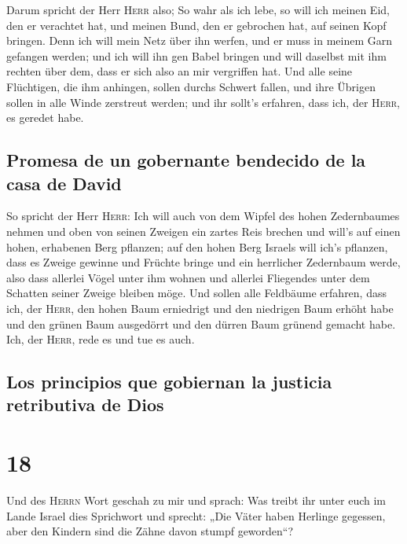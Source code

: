  Darum spricht der Herr \textsc{Herr} also; So wahr als
ich lebe, so will ich meinen Eid, den er verachtet hat, und meinen Bund,
den er gebrochen hat, auf seinen Kopf bringen.  Denn ich
will mein Netz über ihn werfen, und er muss in meinem Garn gefangen
werden; und ich will ihn gen Babel bringen und will daselbst mit ihm
rechten über dem, dass er sich also an mir vergriffen hat.
 Und alle seine Flüchtigen, die ihm anhingen, sollen
durchs Schwert fallen, und ihre Übrigen sollen in alle Winde zerstreut
werden; und ihr sollt's erfahren, dass ich, der \textsc{Herr}, es
geredet habe.

\hypertarget{promesa-de-un-gobernante-bendecido-de-la-casa-de-david}{%
\subsection{Promesa de un gobernante bendecido de la casa de
David}\label{promesa-de-un-gobernante-bendecido-de-la-casa-de-david}}

 So spricht der Herr \textsc{Herr}: Ich will auch von dem
Wipfel des hohen Zedernbaumes nehmen und oben von seinen Zweigen ein
zartes Reis brechen und will's auf einen hohen, erhabenen Berg pflanzen;
 auf den hohen Berg Israels will ich's pflanzen, dass es
Zweige gewinne und Früchte bringe und ein herrlicher Zedernbaum werde,
also dass allerlei Vögel unter ihm wohnen und allerlei Fliegendes unter
dem Schatten seiner Zweige bleiben möge.  Und sollen alle
Feldbäume erfahren, dass ich, der \textsc{Herr}, den hohen Baum
erniedrigt und den niedrigen Baum erhöht habe und den grünen Baum
ausgedörrt und den dürren Baum grünend gemacht habe. Ich, der
\textsc{Herr}, rede es und tue es auch.

\hypertarget{los-principios-que-gobiernan-la-justicia-retributiva-de-dios}{%
\subsection{Los principios que gobiernan la justicia retributiva de
Dios}\label{los-principios-que-gobiernan-la-justicia-retributiva-de-dios}}

\hypertarget{section-17}{%
\section{18}\label{section-17}}

 Und des \textsc{Herrn} Wort geschah zu mir und sprach:
 Was treibt ihr unter euch im Lande Israel dies Sprichwort
und sprecht: „Die Väter haben Herlinge gegessen, aber den Kindern sind
die Zähne davon stumpf geworden``?

